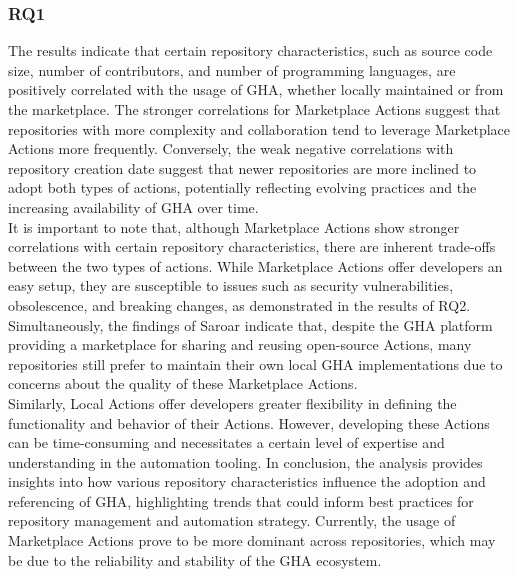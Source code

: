 \documentclass[conference]{IEEEtran}
\begin{document}
    \subsubsection{\textbf{RQ1}} The results indicate that certain repository characteristics, such as source code size, number of contributors, and number of programming languages, are positively correlated with the usage of GHA, whether locally maintained or from the marketplace. The stronger correlations for Marketplace Actions suggest that repositories with more complexity and collaboration tend to leverage Marketplace Actions more frequently. Conversely, the weak negative correlations with repository creation date suggest that newer repositories are more inclined to adopt both types of actions, potentially reflecting evolving practices and the increasing availability of GHA over time.\\ 
    It is important to note that, although Marketplace Actions show stronger correlations with certain repository characteristics, there are inherent trade-offs between the two types of actions. While Marketplace Actions offer developers an easy setup, they are susceptible to issues such as security vulnerabilities, obsolescence, and breaking changes, as demonstrated in the results of RQ2. Simultaneously, the findings of Saroar \cite{saroar2023developers} indicate that, despite the GHA platform providing a marketplace for sharing and reusing open-source Actions, many repositories still prefer to maintain their own local GHA implementations due to concerns about the quality of these Marketplace Actions. \\
    Similarly, Local Actions offer developers greater flexibility in defining the functionality and behavior of their Actions. However, developing these Actions can be time-consuming and necessitates a certain level of expertise and understanding in the automation tooling.
    In conclusion, the analysis provides insights into how various repository characteristics influence the adoption and referencing of GHA, highlighting trends that could inform best practices for repository management and automation strategy. Currently, the usage of Marketplace Actions prove to be more dominant across repositories, which may be due to the reliability and stability of the GHA ecosystem.\\
    
\end{document}
